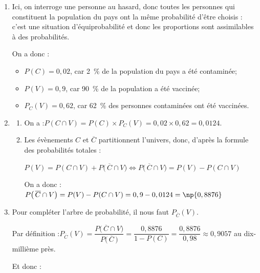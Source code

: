 \medskip

\begin{enumerate}
\item Ici, on interroge une personne au hasard, donc toutes les personnes qui constituent la population du pays ont la même probabilité d'être choisis : c'est une situation d'équiprobabilité et donc les proportions sont assimilables à des probabilités.

On a donc :
\begin{itemize}
\item $P(C) = 0,02$, car 2~\% de la population du pays a été contaminée;
\item $P(V) = 0,9$, car 90~\% de la population a été vaccinée;
\item $P_C(V) = 0,62$, car 62~\% des personnes contaminées ont été vaccinées.
\end{itemize}

\item 
	\begin{enumerate}
		\item On a :\quad $P(C \cap V) = P(C) \times P_C(V) = 0,02 \times 0,62 = 0,0124$.
		\item Les évènements $C$ et $\overline{C}$ partitionnent l'univers, donc, d'après la formule des probabilités totales :

$P(V) = P(C \cap V) + P\big(\,\overline{C}\cap V\big) \iff P\big(\,\overline{C} \cap V\big) = P(V) -
 P(C \cap V)$

On a donc : \quad $P\big(\,\overline{C} \cap V\big) = P(V) - P(C \cap V) = 0,9 - 0,0124 = \np{0,8876}$
	\end{enumerate}
\item Pour compléter l'arbre de probabilité, il nous faut $P_{\overline{C}}(V)$.

Par définition :\quad $P_{\overline{C}}(V) = \dfrac{P\big(\,\overline{C} \cap V\big)}{P\big(\,\overline{C}\,\big)} = \dfrac{0,8876}{1 - P(C)}=\dfrac{0,8876}{0,98} \approx 0,9057$ au dix-millième près.

Et donc : \hfill~
\end{enumerate}
